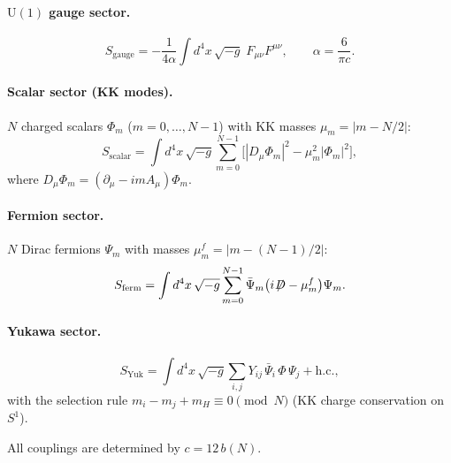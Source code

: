 \paragraph{$\mathrm{U}(1)$ gauge sector.}
\begin{equation}\label{eq:S-gauge}
  S_{\mathrm{gauge}} = -\frac{1}{4\alpha}
  \int d^4x\,\sqrt{-g}\; F_{\mu\nu} F^{\mu\nu},
  \qquad \alpha = \frac{6}{\pi c}.
\end{equation}

\paragraph{Scalar sector (KK modes).}
$N$ charged scalars $\Phi_m$ ($m = 0, \ldots, N{-}1$)
with KK masses $\mu_m = |m - N/2|$:
\begin{equation}\label{eq:S-scalar}
  S_{\mathrm{scalar}} = \int d^4x\,\sqrt{-g} \sum_{m=0}^{N-1}
  \bigl[|D_\mu \Phi_m|^2 - \mu_m^2 |\Phi_m|^2\bigr],
\end{equation}
where $D_\mu \Phi_m = (\partial_\mu - i m A_\mu) \Phi_m$.

\paragraph{Fermion sector.}
$N$ Dirac fermions $\Psi_m$ with masses $\mu^f_m = |m - (N{-}1)/2|$:
\begin{equation}\label{eq:S-ferm}
  S_{\mathrm{ferm}} = \int d^4x\,\sqrt{-g} \sum_{m=0}^{N-1}
  \bar\Psi_m \bigl(i\!\not\!\!D - \mu^f_m\bigr) \Psi_m.
\end{equation}

\paragraph{Yukawa sector.}
\begin{equation}\label{eq:S-Yuk}
  S_{\mathrm{Yuk}} = \int d^4x\,\sqrt{-g} \sum_{i,j}
  Y_{ij}\, \bar\Psi_i\, \Phi\, \Psi_j + \mathrm{h.c.},
\end{equation}
with the selection rule
$m_i - m_j + m_H \equiv 0 \pmod{N}$
(KK charge conservation on~$S^1$).

\medskip\noindent
All couplings are determined by $c = 12\,b(N)$.


